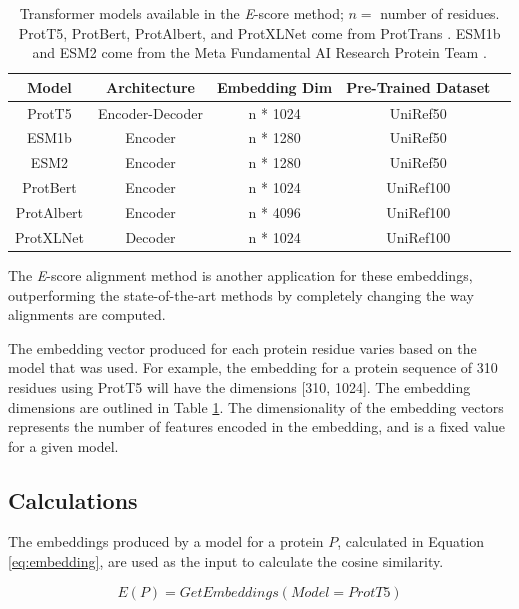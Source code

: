 \begin{table} %
	\caption{Transformer models available in the \textit{E}-score method; \(n=\) number of residues. ProtT5, ProtBert, ProtAlbert, and ProtXLNet come from ProtTrans \cite{Elnaggar:2021}. ESM1b and ESM2 come from the Meta Fundamental AI Research Protein Team \cite{Rives:2021}.}
	\centering
	\begin{tabular}{ |c|c|c|c|c| }
		\toprule
		Model & Architecture & Embedding Dim & Pre-Trained Dataset \\
		\midrule
		ProtT5 & Encoder-Decoder & n * 1024 & UniRef50 \\
        ESM1b & Encoder & n * 1280 & UniRef50 \\
        ESM2 & Encoder & n * 1280 & UniRef50 \\
		ProtBert & Encoder & n * 1024 & UniRef100 \\
		ProtAlbert & Encoder & n * 4096 & UniRef100 \\
        ProtXLNet & Decoder & n * 1024 & UniRef100 \\
		\bottomrule
	\end{tabular}
	\label{tab:transformers}
\end{table}

The \textit{E}-score alignment method is another application for these embeddings, outperforming the state-of-the-art methods \cite{Ashrafzadeh:2023} by completely changing the way alignments are computed.

The embedding vector produced for each protein \gls{residue} varies based on the model that was used. For example, the embedding for a protein sequence of 310 residues using ProtT5 will have the dimensions [310, 1024]. The embedding dimensions are outlined in Table \ref{tab:transformers}. The dimensionality of the embedding vectors represents the number of features encoded in the embedding, and is a fixed value for a given model.

\subsection{Calculations}
The embeddings produced by a model for a protein \(P\), calculated in Equation \ref{eq:embedding}, are used as the input to calculate the cosine similarity.

\begin{equation}
    E(P) = GetEmbeddings(Model = ProtT5)
    \label{eq:embedding}
\end{equation}

